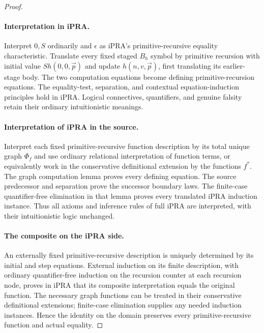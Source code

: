 \begin{proof}
\paragraph{Interpretation in iPRA.}
Interpret $0,S$ ordinarily and $\epsilon$ as iPRA's primitive-recursive
equality characteristic.  Translate every fixed staged $B_h$ symbol
by primitive recursion with initial value $S h(0,0,\vec p)$ and update
$h(n,v,\vec p)$, first translating its earlier-stage body.  The two
computation equations become defining primitive-recursion equations.
The equality-test, separation, and contextual equation-induction
principles hold in iPRA.  Logical connectives, quantifiers, and genuine
falsity retain their ordinary intuitionistic meanings.

\paragraph{Interpretation of iPRA in the source.}
Interpret each fixed primitive-recursive function description by its
total unique graph $\Phi_f$ and use ordinary relational interpretation
of function terms, or equivalently work in the conservative
definitional extension by the functions $f^*$.  The graph computation
lemma proves every defining equation.  The source predecessor and
separation prove the successor boundary laws.  The finite-case
quantifier-free elimination in that lemma proves every translated
iPRA induction instance.  Thus all axioms and inference rules of
full iPRA are interpreted, with their intuitionistic logic unchanged.

\paragraph{The composite on the iPRA side.}
An externally fixed primitive-recursive description is uniquely
determined by its initial and step equations.  External induction on
its finite description, with ordinary quantifier-free induction on
the recursion counter at each recursion node, proves in iPRA that
its composite interpretation equals the original function.  The
necessary graph functions can be treated in their conservative
definitional extensions; finite-case elimination supplies any needed
induction instances.  Hence the identity on the domain preserves
every primitive-recursive function and actual equality.


\end{proof}

